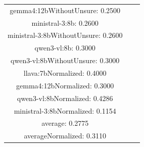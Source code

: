 \documentclass[a4paper]{article}
\begin{document}
\begin{tabular}{ccc}
gemma4:12bWithoutUnsure: 0.2500 \\ ministral-3:8b: 0.2600 \\ ministral-3:8bWithoutUnsure: 0.2600 \\ qwen3-vl:8b: 0.3000 \\ qwen3-vl:8bWithoutUnsure: 0.3000 \\ llava:7bNormalized: 0.4000 \\ gemma4:12bNormalized: 0.3000 \\ qwen3-vl:8bNormalized: 0.4286 \\ ministral-3:8bNormalized: 0.1154 \\ average: 0.2775 \\ averageNormalized: 0.3110 \end{minipage}\\
\end{tabular}

\vspace{5mm}
\end{document}
